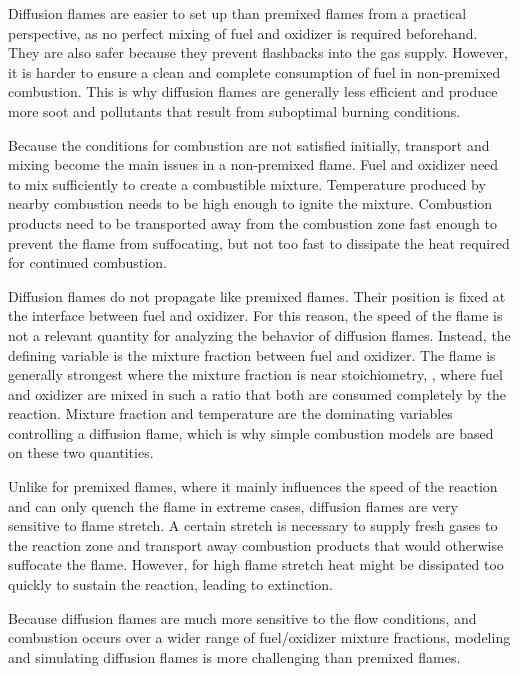 %
Diffusion flames are easier to set up than premixed flames from a practical
perspective, as no perfect mixing of fuel and oxidizer is required beforehand.
%
They are also safer because they prevent flashbacks into the gas supply.
%
However, it is harder to ensure a clean and complete consumption of fuel in
non-premixed combustion.
%
This is why diffusion flames are generally less efficient and produce more
soot and pollutants that result from suboptimal burning conditions.
%

%
Because the conditions for combustion are not satisfied initially, transport and
mixing become the main issues in a non-premixed flame.
%
Fuel and oxidizer need to mix sufficiently to create a combustible mixture.
%
Temperature produced by nearby combustion needs to be high enough to ignite
the mixture.
%
Combustion products need to be transported away from the combustion zone fast
enough to prevent the flame from suffocating, but not too fast to dissipate the
heat required for continued combustion.
%

%
Diffusion flames do not propagate like premixed flames.
%
Their position is fixed at the interface between fuel and oxidizer.
%
For this reason, the speed of the flame is not a relevant quantity for
analyzing the behavior of diffusion flames.
%
Instead, the defining variable is the mixture fraction between fuel and
oxidizer.
%
The flame is generally strongest where the mixture fraction is near
stoichiometry, \ie{}, where fuel and oxidizer are mixed in such a ratio that
both are consumed completely by the reaction.
%
Mixture fraction and temperature are the dominating variables controlling a
diffusion flame, which is why simple combustion models are based on these two
quantities.
%

%
Unlike for premixed flames, where it mainly influences the speed of the reaction
and can only quench the flame in extreme cases, diffusion flames are very
sensitive to flame stretch.
%
A certain stretch is necessary to supply fresh gases to the reaction zone and
transport away combustion products that would otherwise suffocate the flame.
%
However, for high flame stretch heat might be dissipated too quickly to sustain
the reaction, leading to extinction.
%

%
Because diffusion flames are much more sensitive to the flow conditions, and
combustion occurs over a wider range of fuel/oxidizer mixture fractions,
modeling and simulating diffusion flames is more challenging than premixed
flames.
%
%
%
